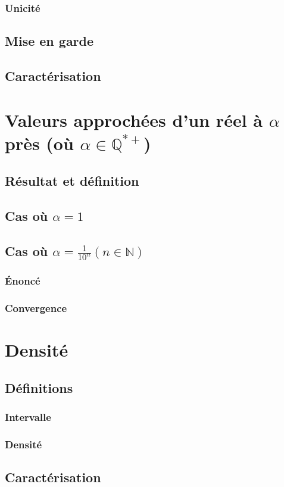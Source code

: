 \documentclass[12pt,a4paper,french]{book}
\begin{document}
			\subsubsection{Unicité}
		\subsection{Mise en garde}
		\subsection{Caractérisation}
	\section{Valeurs approchées d'un réel à $\alpha$ près (où $\alpha \in \mathbb{Q}^{\ast+}$)}
		\subsection{Résultat et définition}
		\subsection{Cas où $\alpha = 1$}
		\subsection{Cas où $\alpha = \frac{1}{10^{n}} (n \in \mathbb{N})$}
			\subsubsection{Énoncé}
			\subsubsection{Convergence}
	\section{Densité}
		\subsection{Définitions}
			\subsubsection{Intervalle}
			\subsubsection{Densité}
		\subsection{Caractérisation}
\end{document}
